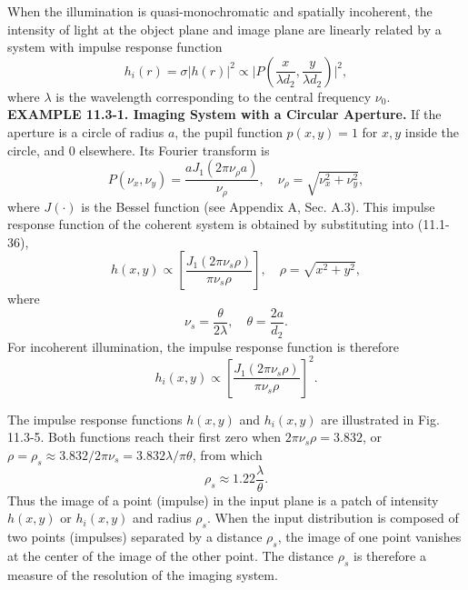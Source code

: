 \documentclass{article}
\newcommand\crule[3][black]{\textcolor{#1}{\rule{#2}{#3}}}
\numberwithin{figure}{subsection}
\numberwithin{table}{subsection}
\begin{document}
\par When the illumination is quasi-monochromatic and spatially incoherent, the intensity of light at the object plane and image plane are linearly related by a system with impulse response function
\begin{equation}
h_i (r) = \sigma \lvert h(r) \rvert ^2 \propto \lvert P(\frac{x}{\lambda d_2}, \frac{y}{\lambda d_2}) \rvert ^2 ,
\end{equation}
where $\lambda$ is the wavelength corresponding to the central frequency $\nu_0$.\\
\noindent{\crule[ksc]{\textwidth}{0.1cm}}
\textbf{EXAMPLE 11.3-1. Imaging System with a Circular Aperture.} If the aperture is a circle of radius $a$, the pupil function $p(x,y) = 1$ for $x,y$ inside the circle, and 0 elsewhere. Its Fourier transform is
\begin{equation}
P(\nu_x, \nu_y) = \frac{a J_1 (2\pi \nu_\rho a)}{\nu_\rho} , \quad \nu_\rho = \sqrt{\nu_x^2 + \nu_y^2} ,
\end{equation}
where $J(\cdot)$ is the Bessel function (see Appendix A, Sec. A.3). This impulse response function of the coherent system is obtained by substituting into (11.1-36),
\begin{equation}
h(x,y) \propto [\frac{J_1 (2\pi\nu_s \rho)}{\pi\nu_s \rho}] , \quad \rho = \sqrt{x^2 + y^2} ,
\end{equation}
where 
\begin{equation}
\nu_s = \frac{\theta}{2 \lambda} , \quad \theta = \frac{2a}{d_2} .
\end{equation}
For incoherent illumination, the impulse response function is therefore
\begin{equation}
h_i (x,y) \propto [\frac{J_1 (2\pi\nu_s \rho)}{\pi\nu_s \rho}]^2 .
\end{equation}
\par The impulse response functions $h(x,y)$ and $h_i (x,y)$ are illustrated in Fig. 11.3-5. Both functions reach their first zero when $2\pi \nu_s \rho = 3.832$, or $\rho = \rho_s \approx 3.832 / 2\pi \nu_s = 3.832\lambda / \pi\theta$, from which
\begin{equation}
\rho_s \approx 1.22 \frac{\lambda}{\theta} .
\end{equation}
Thus the image of a point (impulse) in the input plane is a patch of intensity $h (x,y)$ or $h_i (x,y)$ and radius $\rho_s$. When the input distribution is composed of two points (impulses) separated by a distance $\rho_s$, the image of one point vanishes at the center of the image of the other point. The distance $\rho_s$ is therefore a measure of the resolution of the imaging system.
\end{document}
